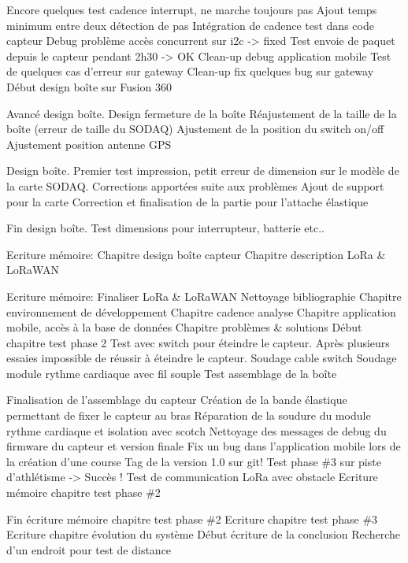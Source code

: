 \begin{multicols}{2}
Encore quelques test cadence interrupt, ne marche toujours pas
Ajout temps minimum entre deux détection de pas
Intégration de cadence test dans code capteur
Debug problème accès concurrent sur i2c -> fixed
Test envoie de paquet depuis le capteur pendant 2h30 -> OK
Clean-up debug application mobile
Test de quelques cas d’erreur sur gateway
Clean-up fix quelques bug sur gateway
Début design boîte sur Fusion 360

Avancé design boîte. Design fermeture de la boîte
Réajustement de la taille de la boîte (erreur de taille du SODAQ)
Ajustement de la position du switch on/off
Ajustement position antenne GPS

Design boîte. Premier test impression, petit erreur de dimension sur le modèle de la carte SODAQ.
Corrections apportées suite aux problèmes
Ajout de support pour la carte
Correction et finalisation de la partie pour l’attache élastique

Fin design boîte. Test dimensions pour interrupteur, batterie etc..

Ecriture mémoire:
Chapitre design boîte capteur
Chapitre description LoRa \& LoRaWAN

Ecriture mémoire:
Finaliser LoRa \& LoRaWAN
Nettoyage bibliographie
Chapitre environnement de développement
Chapitre cadence analyse
Chapitre application mobile, accès à la base de données
Chapitre problèmes \& solutions
Début chapitre test phase 2
Test avec switch pour éteindre le capteur. Après plusieurs essaies impossible de réussir à éteindre le capteur.
Soudage cable switch
Soudage module rythme cardiaque avec fil souple
Test assemblage de la boîte

Finalisation de l’assemblage du capteur
Création de la bande élastique permettant de fixer le capteur au bras
Réparation de la soudure du module rythme cardiaque et isolation avec scotch
Nettoyage des messages de debug du firmware du capteur et version finale
Fix un bug dans l’application mobile lors de la création d’une course
Tag de la version 1.0 sur git!
Test phase \#3 sur piste d’athlétisme -> Succès !
Test de communication LoRa avec obstacle
Ecriture mémoire chapitre test phase \#2

Fin écriture mémoire chapitre test phase \#2
Ecriture chapitre test phase \#3
Ecriture chapitre évolution du système
Début écriture de la conclusion
Recherche d’un endroit pour test de distance


\end{multicols}
